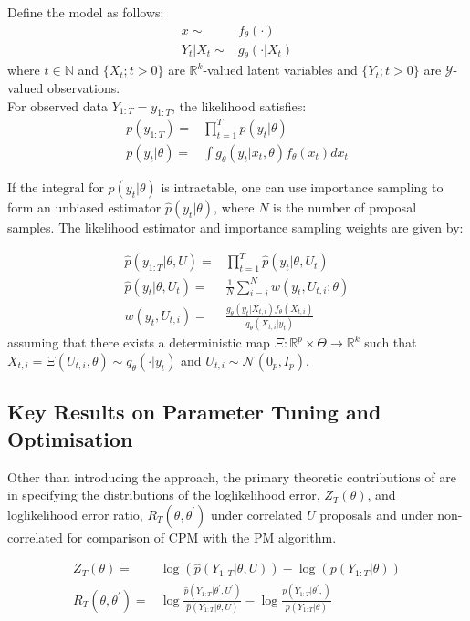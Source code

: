 \documentclass{article}
\begin{document}
Define the model as follows:
\begin{align}
x \sim& f_\theta(\cdot) \\
Y_t| X_t \sim& g_\theta(\cdot | X_t)
\end{align}
where $t \in \mathbb{N}$ and $\{X_t; t>0\}$ are $\mathbb{R}^k$-valued latent variables and $\{Y_t; t>0\}$ are $\mathcal{Y}$-valued observations.\\

For observed data $Y_{1:T}=y_{1:T}$, the likelihood satisfies:
\begin{align}
p(y_{1:T})=& \prod_{t=1}^{T} p(y_t|\theta) \\
p(y_t| \theta)=& \int g_\theta(y_t|x_t,\theta)f_\theta(x_t) dx_t
\end{align}

If the integral for $p(y_t| \theta)$ is intractable, one can use importance sampling to form an unbiased estimator $\hat{p}(y_t| \theta)$, where $N$ is the number of proposal samples. The likelihood estimator and importance sampling weights are given by:

\begin{align}
\hat{p}(y_{1:T}| \theta, U) =& \prod_{t=1}^{T} \hat{p}(y_t|\theta, U_t) \\
\hat{p}(y_t| \theta, U_t)=& \frac{1}{N} \sum_{i=i}^N w(y_t, U_{t,i}; \theta ) \\
w(y_t, U_{t,i}) =& \frac{g_\theta(y_t|X_{t,i})f_\theta(X_{t,i})}{q_\theta(X_{t,i}|y_t)}
\end{align}
assuming that there exists a deterministic map $ \Xi: \mathbb{R}^p \times \Theta \rightarrow \mathbb{R}^k$ such that $X_{t,i} = \Xi(U_{t,i}, \theta) \sim q_\theta(\cdot|y_t)$ and $U_{t,i} \sim \mathcal{N}(0_p, I_p) $.

\subsection{Key Results on Parameter Tuning and Optimisation} \label{norm_dist}

Other than introducing the approach, the primary theoretic contributions of \cite{cpmmDeligiannidis2015} are in specifying the distributions of the loglikelihood error, $Z_T(\theta)$, and loglikelihood error ratio, $R_T(\theta, \theta^\prime)$ under correlated $U$ proposals and under non-correlated for comparison of CPM with the PM algorithm.

\begin{align}
Z_T(\theta) =& \log(\hat{p}(Y_{1:T}| \theta, U)) - \log(p(Y_{1:T}|\theta))\label{eq:Z} \\
R_T(\theta, \theta^\prime) =& \log \frac{\hat{p}(Y_{1:T}| \theta^\prime, U^\prime)}{\hat{p}(Y_{1:T}| \theta, U)} - \log \frac{p(Y_{1:T}| \theta^\prime,)}{p(Y_{1:T}| \theta)} \label{eq:R}
\end{align}
\end{document}
